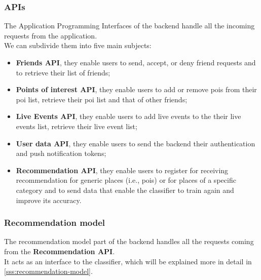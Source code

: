 \documentclass[../../main]{subfiles}
\begin{document}
\subsubsection{APIs}
The Application Programming Interfaces of the backend handle all the incoming requests from the application.\\
We can subdivide them into five main subjects:
\begin{itemize}
    \item \textbf{Friends API}, they enable users to send, accept, or deny friend requests and to retrieve their list of friends;
    \item \textbf{Points of interest API}, they enable users to add or remove pois from their poi list, retrieve their poi list and that of other friends;
    \item \textbf{Live Events API}, they enable users to add live events to the their live events list, retrieve their live event list;
    \item \textbf{User data API}, they enable users to send the backend their authentication and push notification tokens;
    \item \textbf{Recommendation API}, they enable users to register for receiving recommendation for generic places (i.e., pois) or for places of a specific category and to send data that enable the classifier to train again and improve its accuracy.
\end{itemize}

\label{sss:recommendation-model}
\subsubsection{Recommendation model}
The recommendation model part of the backend handles all the requests coming from the \textbf{Recommendation API}.\\
It acts as an interface to the classifier, which will be explained more in detail in \ref{sss:recommendation-model}.
\end{document}
